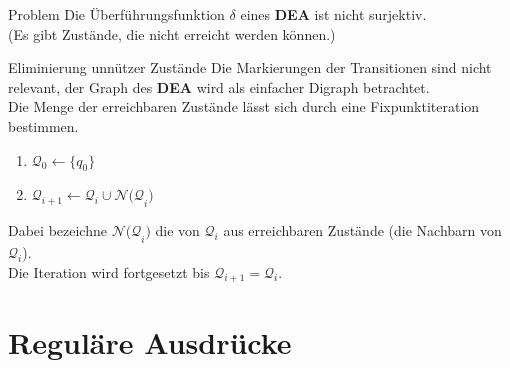 \documentclass[]{beamer}
\begin{document}
\begin{frame}[squeeze]{}
  \begin{alertblock}{Problem}
    Die Überführungsfunktion $\delta$ eines \textbf{DEA} ist nicht surjektiv. \\
    (Es gibt Zustände, die nicht erreicht werden können.)
  \end{alertblock}
  
  \pause
  
  \begin{exampleblock}{Eliminierung unnützer Zustände}
    Die Markierungen der Transitionen sind nicht relevant, der Graph des \textbf{DEA} wird als einfacher Digraph betrachtet. \\
    \pause
    \vspace*{0.5em}
    Die Menge der erreichbaren Zustände lässt sich durch eine Fixpunktiteration bestimmen.
    \begin{enumerate}
      \item $\mathcal{Q}_0 \leftarrow \{q_0\}$
      \item $\mathcal{Q}_{i+1} \leftarrow \mathcal{Q}_i \cup \mathcal{N(Q}_i)$
    \end{enumerate}
    Dabei bezeichne $\mathcal{N(Q}_i)$ die von $\mathcal{Q}_i$ aus erreichbaren Zustände (die Nachbarn von $\mathcal{Q}_i$). \\
    \vspace*{0.5em}
    Die Iteration wird fortgesetzt bis $\mathcal{Q}_{i+1} = \mathcal{Q}_i$.
  \end{exampleblock}
\end{frame}

\section{Reguläre Ausdrücke}
\end{document}
